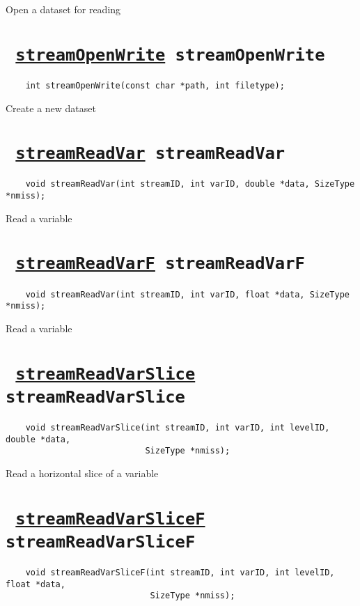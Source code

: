 Open a dataset for reading
\ifpdfoutput{}{(\ref{streamOpenRead})}


\section*{\texttt{ 
\ifpdf
\hyperref[streamOpenWrite]{streamOpenWrite}
\else
streamOpenWrite
\fi
}}
\begin{verbatim}
    int streamOpenWrite(const char *path, int filetype);
\end{verbatim}

Create a new dataset
\ifpdfoutput{}{(\ref{streamOpenWrite})}


\section*{\texttt{ 
\ifpdf
\hyperref[streamReadVar]{streamReadVar}
\else
streamReadVar
\fi
}}
\begin{verbatim}
    void streamReadVar(int streamID, int varID, double *data, SizeType *nmiss);
\end{verbatim}

Read a variable
\ifpdfoutput{}{(\ref{streamReadVar})}


\section*{\texttt{ 
\ifpdf
\hyperref[streamReadVarF]{streamReadVarF}
\else
streamReadVarF
\fi
}}
\begin{verbatim}
    void streamReadVar(int streamID, int varID, float *data, SizeType *nmiss);
\end{verbatim}

Read a variable
\ifpdfoutput{}{(\ref{streamReadVarF})}


\section*{\texttt{ 
\ifpdf
\hyperref[streamReadVarSlice]{streamReadVarSlice}
\else
streamReadVarSlice
\fi
}}
\begin{verbatim}
    void streamReadVarSlice(int streamID, int varID, int levelID, double *data, 
                            SizeType *nmiss);
\end{verbatim}

Read a horizontal slice of a variable
\ifpdfoutput{}{(\ref{streamReadVarSlice})}


\section*{\texttt{ 
\ifpdf
\hyperref[streamReadVarSliceF]{streamReadVarSliceF}
\else
streamReadVarSliceF
\fi
}}
\begin{verbatim}
    void streamReadVarSliceF(int streamID, int varID, int levelID, float *data, 
                             SizeType *nmiss);
\end{verbatim}

